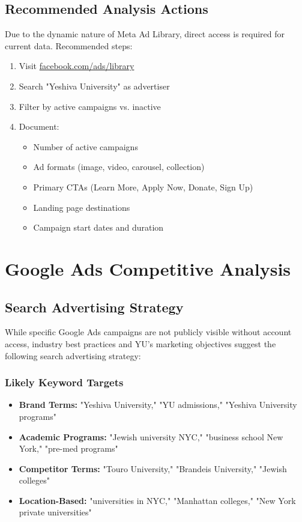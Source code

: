 \documentclass[12pt,letterpaper]{article}
\begin{document}
\subsection{Recommended Analysis Actions}

Due to the dynamic nature of Meta Ad Library, direct access is required for current data. Recommended steps:

\begin{enumerate}[leftmargin=*]
    \item Visit \url{facebook.com/ads/library}
    \item Search "Yeshiva University" as advertiser
    \item Filter by active campaigns vs. inactive
    \item Document:
    \begin{itemize}
        \item Number of active campaigns
        \item Ad formats (image, video, carousel, collection)
        \item Primary CTAs (Learn More, Apply Now, Donate, Sign Up)
        \item Landing page destinations
        \item Campaign start dates and duration
    \end{itemize}
\end{enumerate}

\section{Google Ads Competitive Analysis}

\subsection{Search Advertising Strategy}

While specific Google Ads campaigns are not publicly visible without account access, industry best practices and YU's marketing objectives suggest the following search advertising strategy:

\subsubsection{Likely Keyword Targets}
\begin{itemize}[leftmargin=*]
    \item \textbf{Brand Terms:} "Yeshiva University," "YU admissions," "Yeshiva University programs"
    \item \textbf{Academic Programs:} "Jewish university NYC," "business school New York," "pre-med programs"
    \item \textbf{Competitor Terms:} "Touro University," "Brandeis University," "Jewish colleges"
    \item \textbf{Location-Based:} "universities in NYC," "Manhattan colleges," "New York private universities"
\end{itemize}
\end{document}
